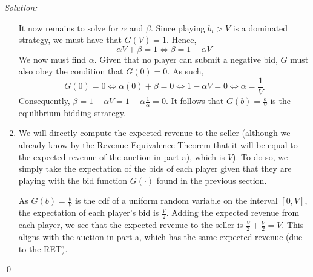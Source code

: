 \documentclass[12pt]{article}
\newenvironment{problem}[2][Problem]{\begin{trivlist}
\item[\hskip \labelsep {\bfseries #1}\hskip \labelsep {\bfseries #2.}]}{\end{trivlist}}
\newenvironment{sol}
    {\emph{Solution:}
    }
    {
    \qed
    }
\begin{document}
\begin{sol}
\begin{enumerate}[label=\alph*) ]
    It now remains to solve for $\alpha$ and $\beta$. Since playing $b_i > V$ is a dominated strategy, we must have that $G(V) = 1$. Hence,
    \[\alpha V + \beta = 1 \iff \beta = 1 - \alpha V\]
    We now must find $\alpha$. Given that no player can submit a negative bid, $G$ must also obey the condition that $G(0) = 0$. As such,
    \[G(0) = 0 \iff \alpha (0) + \beta = 0 \iff 1 - \alpha V = 0 \iff \alpha = \frac{1}{V}\]
    Consequently, $\beta = 1 - \alpha V = 1- \alpha \frac{1}{\alpha} = 0$. It follows that $G(b) = \frac{b}{V}$ is the equilibrium bidding strategy.
    \item We will directly compute the expected revenue to the seller (although we already know by the Revenue Equivalence Theorem that it will be equal to the expected revenue of the auction in part a), which is $V$). To do so, we simply take the expectation of the bids of each player given that they are playing with the bid function $G(\cdot)$ found in the previous section.
    
    As $G(b) = \frac{b}{V}$ is the cdf of a uniform random variable on the interval $[0,V]$, the expectation of each player's bid is $\frac{V}{2}$. Adding the expected revenue from each player, we see that the expected revenue to the seller is $\frac{V}{2} + \frac{V}{2} = V$. This aligns with the auction in part a, which has the same expected revenue (due to the RET).
\end{enumerate}
\end{sol}
\begin{problem}{3}
\end{problem}
\end{document}
